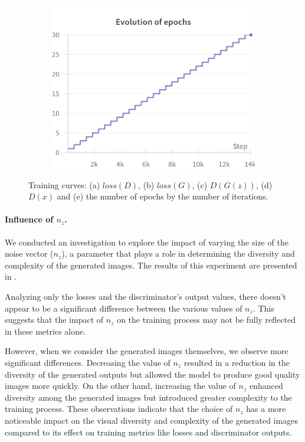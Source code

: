 \begin{figure}[H]
    \begin{subfigure}{0.45\textwidth}
        \centering
        \includegraphics[width=0.95\linewidth]{longer_epochs/epochs.png}
        \caption{}
        \label{subfig:longer_epochs/epochs}
    \end{subfigure}%

    \caption{Training curves: (a) $loss(D)$, (b) $loss(G)$, (c) $D(G(z))$, (d) $D(x)$ and (e) the number of epochs by the number of iterations.}
    \label{fig:longer_epochs_losses}
\end{figure}



\paragraph*{Influence of $n_z$.}
We conducted an investigation to explore the impact of varying the size of the noise vector ($n_z$), a parameter that plays a role in determining the diversity and complexity of the generated images. The results of this experiment are presented in .

Analyzing only the losses and the discriminator's output values, there doesn't appear to be a significant difference between the various values of $n_z$. This suggests that the impact of $n_z$ on the training process may not be fully reflected in these metrics alone.

However, when we consider the generated images themselves, we observe more significant differences. Decreasing the value of $n_z$ resulted in a reduction in the diversity of the generated outputs but allowed the model to produce good quality images more quickly. On the other hand, increasing the value of $n_z$ enhanced diversity among the generated images but introduced greater complexity to the training process. These observations indicate that the choice of $n_z$ has a more noticeable impact on the visual diversity and complexity of the generated images compared to its effect on training metrics like losses and discriminator outputs.

